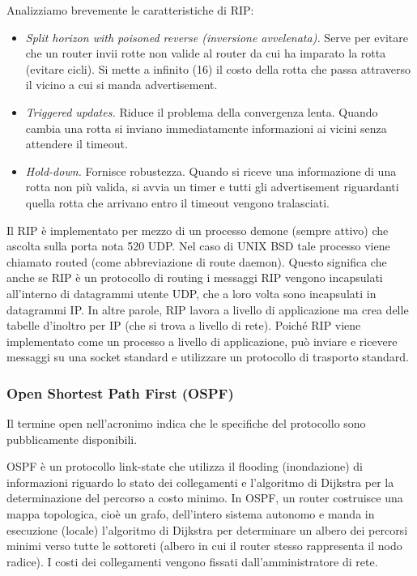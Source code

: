 Analizziamo brevemente le caratteristiche di RIP:
\begin{itemize}
    \item \textit{Split horizon with poisoned reverse (inversione avvelenata).} Serve per evitare che un router invii rotte non valide al router da cui ha imparato la rotta (evitare cicli). Si mette a infinito (16) il costo della rotta che passa attraverso il vicino a cui si manda advertisement.
    \item \textit{Triggered updates.} Riduce il problema della convergenza lenta. Quando cambia una rotta si inviano immediatamente informazioni ai vicini senza attendere il timeout.
    \item \textit{Hold-down.} Fornisce robustezza. Quando si riceve una informazione di una rotta non più valida, si avvia un timer e tutti gli advertisement riguardanti quella rotta che arrivano entro il timeout vengono tralasciati.
\end{itemize}

Il RIP è implementato per mezzo di un processo demone (sempre attivo) che ascolta sulla porta nota 520 UDP. Nel caso di UNIX BSD tale processo viene chiamato routed (come abbreviazione di route daemon). Questo significa che anche se RIP è un protocollo di routing i messaggi RIP vengono incapsulati all'interno di datagrammi utente UDP, che a loro volta sono incapsulati in datagrammi IP. In altre parole, RIP lavora a livello di applicazione ma crea delle tabelle d'inoltro per IP (che si trova a livello di rete). Poiché RIP viene implementato come un processo a livello di applicazione, può inviare e ricevere messaggi su una socket standard e utilizzare un protocollo di trasporto standard.

\subsubsection{Open Shortest Path First (OSPF)}
Il termine open nell’acronimo indica che le specifiche del protocollo sono pubblicamente disponibili. 

OSPF è un protocollo link-state che utilizza il flooding (inondazione) di informazioni riguardo lo stato dei collegamenti e l’algoritmo di Dijkstra per la determinazione del percorso a costo minimo. In OSPF, un router costruisce una mappa topologica, cioè un grafo, dell’intero sistema autonomo e manda in esecuzione (locale) l’algoritmo di Dijkstra per determinare un albero dei percorsi minimi verso tutte le sottoreti (albero in cui il router stesso rappresenta il nodo radice). I costi dei collegamenti vengono fissati dall’amministratore di rete.


